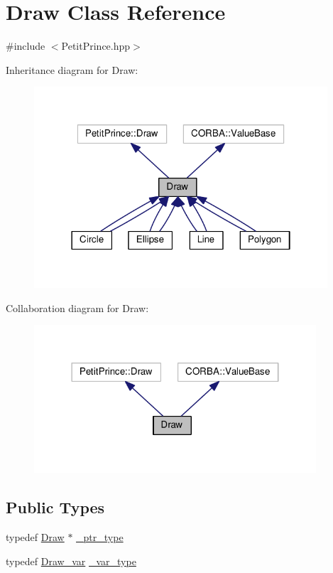 \hypertarget{class_draw}{}\section{Draw Class Reference}
\label{class_draw}


{\ttfamily \#include $<$Petit\+Prince.\+hpp$>$}



Inheritance diagram for Draw\+:
\nopagebreak
\begin{figure}[H]
\begin{center}
\leavevmode
\includegraphics[width=310pt]{class_draw__inherit__graph}
\end{center}
\end{figure}


Collaboration diagram for Draw\+:
\nopagebreak
\begin{figure}[H]
\begin{center}
\leavevmode
\includegraphics[width=298pt]{class_draw__coll__graph}
\end{center}
\end{figure}
\subsection*{Public Types}
\begin{DoxyCompactItemize}
\item 
typedef \hyperlink{class_draw}{Draw} $\ast$ \hyperlink{class_draw_a5164256572b3c4123ceecd1897c248dd}{\+\_\+ptr\+\_\+type}
\item 
typedef \hyperlink{_petit_prince_8hpp_ad6329853fd4733d5723ae5cc6c8a9f43}{Draw\+\_\+var} \hyperlink{class_draw_a0ef4fbc763491a2013fa08badb5ee934}{\+\_\+var\+\_\+type}
\end{DoxyCompactItemize}
